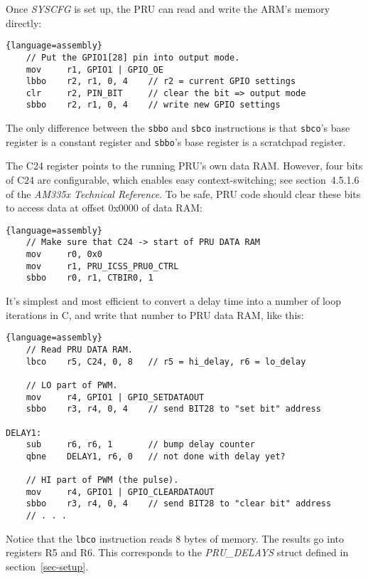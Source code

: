 \documentclass[letterpaper,11pt,fleqn]{article}
\newcommand{\techref}{\textit{AM335x Technical Reference}}
\begin{document}
Once \textit{SYSCFG} is set up, the PRU can read and write the ARM's memory
directly:

\begin{lstlisting}{language=assembly}
    // Put the GPIO1[28] pin into output mode.
    mov     r1, GPIO1 | GPIO_OE
    lbbo    r2, r1, 0, 4    // r2 = current GPIO settings
    clr     r2, PIN_BIT     // clear the bit => output mode
    sbbo    r2, r1, 0, 4    // write new GPIO settings
\end{lstlisting}

The only difference between the \texttt{sbbo} and \texttt{sbco} instructions is
that \texttt{sbco}'s base register is a constant register and \texttt{sbbo}'s
base register is a scratchpad register.

The C24 register points to the running PRU's own data RAM. However, four bits
of C24 are configurable, which enables easy context-switching; see
section~4.5.1.6 of the \techref. To be safe, PRU code should clear these bits
to access data at offset 0x0000 of data RAM:

\begin{lstlisting}{language=assembly}
    // Make sure that C24 -> start of PRU DATA RAM
    mov     r0, 0x0
    mov     r1, PRU_ICSS_PRU0_CTRL
    sbbo    r0, r1, CTBIR0, 1
\end{lstlisting}

It's simplest and most efficient to convert a delay time into a number of
loop iterations in C, and write that number to PRU data RAM, like this:

\begin{lstlisting}{language=assembly}
    // Read PRU DATA RAM.
    lbco    r5, C24, 0, 8   // r5 = hi_delay, r6 = lo_delay

    // LO part of PWM.
    mov     r4, GPIO1 | GPIO_SETDATAOUT
    sbbo    r3, r4, 0, 4    // send BIT28 to "set bit" address

DELAY1:
    sub     r6, r6, 1       // bump delay counter
    qbne    DELAY1, r6, 0   // not done with delay yet?

    // HI part of PWM (the pulse).
    mov     r4, GPIO1 | GPIO_CLEARDATAOUT
    sbbo    r3, r4, 0, 4    // send BIT28 to "clear bit" address
    // . . .
\end{lstlisting}

Notice that the \texttt{lbco} instruction reads 8 bytes of memory. The results
go into registers R5 and R6. This corresponds to the \textit{PRU\_DELAYS}
struct defined in section~\ref{sec-setup}.
\end{document}
